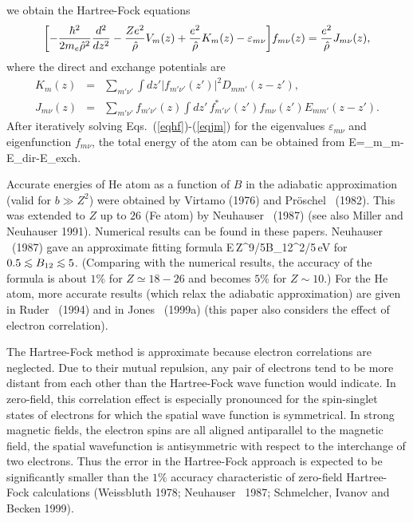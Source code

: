 we obtain the Hartree-Fock equations
\begin{equation}
\biggl [-{ \hbar^2 \over 2 m_e {\hat \rho}^2}
{d^2 \over dz^2} - {Ze^2 \over \hat \rho} V_m(z)
+ {e^2 \over \hat \rho} K_m (z) - {\varepsilon}_{m\nu} \biggr] f_{m\nu}(z)=
{e^2 \over \hat \rho} J_{m \nu}(z),
\label{eqhf}\end{equation}
where the direct and exchange potentials are
\begin{eqnarray}
K_m(z) &=& \sum_{m'\nu'}\int\!dz' |f_{m'\nu'}(z')|^2 D_{mm'}(z-z'), \\
J_{m\nu}(z) &=& \sum_{m'\nu'} f_{m'\nu'}(z) \int\!dz'\, f^*_{m'\nu'}(z') 
f_{m\nu}(z') E_{mm'}(z-z').
\label{eqjm}\end{eqnarray}
After iteratively solving Eqs.~(\ref{eqhf})-(\ref{eqjm}) for 
the eigenvalues $\varepsilon_{m\nu}$ and eigenfunction $f_{m\nu}$, 
the total energy of the atom can be obtained from
\be
E=\sum_{m\nu}\varepsilon_{m\nu}-E_{\rm dir}-E_{\rm exch}.
\label{eqehf}\ee

Accurate energies of He atom as a function of $B$ in the adiabatic 
approximation (valid for $b\gg Z^2$) were obtained by Virtamo (1976) 
and Pr\"oschel \etal~(1982). This was extended to $Z$ up to $26$ (Fe atom) by 
Neuhauser \etal~(1987) (see also Miller and Neuhauser 1991).
Numerical results can be found in these papers. 
Neuhauser \etal~(1987) gave an approximate fitting formula 
\be
E\,Z^{9/5}B_{12}^{2/5}\,{\rm eV}
\label{eqeatom}\ee
for $0.5\lo B_{12}\lo 5$. (Comparing with the numerical results, the accuracy 
of the formula is about $1\%$ for $Z\simeq 18-26$ and
becomes $5\%$ for $Z\sim 10$.) For the He atom, more accurate results
(which relax the adiabatic approximation) are given in
Ruder \etal~(1994) and in Jones \etal~(1999a) (this paper also considers 
the effect of electron correlation).   

The Hartree-Fock method is approximate because electron correlations are
neglected. Due to their mutual repulsion, any pair of electrons tend to be
more distant from each other than the Hartree-Fock wave function would 
indicate. In zero-field, this correlation effect is especially
pronounced for the spin-singlet states of electrons for which the spatial 
wave function is symmetrical. In strong magnetic fields, the electron spins are
all aligned antiparallel to the magnetic field, the spatial wavefunction is
antisymmetric with respect to the interchange of two electrons. 
Thus the error in the Hartree-Fock approach is expected to be 
significantly smaller than the $1\%$ accuracy characteristic of zero-field
Hartree-Fock calculations (Weissbluth 1978; Neuhauser \etal~1987;
Schmelcher, Ivanov and Becken 1999). 

